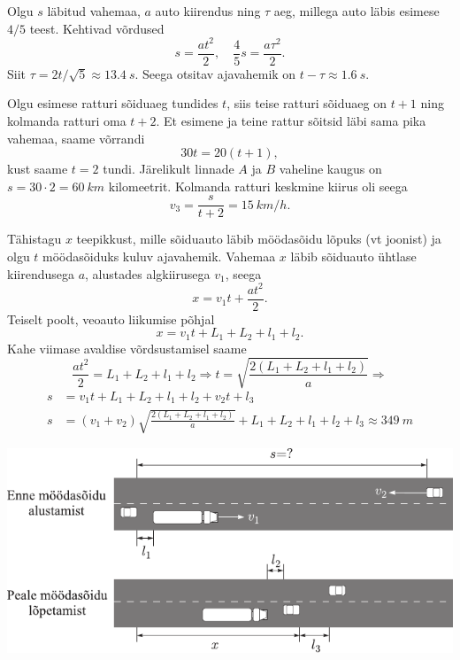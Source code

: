 \documentclass[10pt, twoside]{article}
\begin{document}
{%

\solu
Olgu $s$ läbitud vahemaa, $a$ auto kiirendus ning $\tau$ aeg, millega auto läbis esimese $4/5$ teest. Kehtivad võrdused
\[
s=\frac{a t^{2}}{2}, \quad \frac{4}{5} s=\frac{a \tau^{2}}{2}.
\]
Siit $\tau = 2t/\sqrt 5\approx \SI{13,4}{s}$. Seega otsitav ajavahemik on $t-\tau\approx \SI{1,6}{s}$.
\probend
\bigskip


\solu
Olgu esimese ratturi sõiduaeg tundides $t$, siis teise ratturi sõiduaeg on $t + 1$ ning kolmanda ratturi oma $t+2$. Et esimene ja teine rattur sõitsid läbi sama pika vahemaa, saame võrrandi
\[
30 t=20(t+1),
\]
kust saame $t = \num{2}$ tundi. Järelikult linnade $A$ ja $B$ vaheline kaugus on $s = \num{30}·\num{2} = \SI{60}{km}$ kilomeetrit. Kolmanda ratturi keskmine kiirus oli seega
\[
v_{3}=\frac{s}{t+2}=\SI{15}{km/h}.
\]
\probend
\bigskip


\solu
Tähistagu $x$ teepikkust, mille sõiduauto läbib möödasõidu lõpuks (vt joonist) ja olgu $t$ möödasõiduks kuluv ajavahemik. Vahemaa $x$ läbib sõiduauto ühtlase kiirendusega $a$, alustades algkiirusega $v_1$, seega
\[
x = v_1t + \frac{at^2}{2}. 
\]
Teiselt poolt, veoauto liikumise põhjal
\[
x = v_1t + L_1 + L_2 + l_1 + l_2.
\]
Kahe viimase avaldise võrdsustamisel saame
\[
\frac{a t^{2}}{2}=L_{1}+L_{2}+l_{1}+l_{2} \Rightarrow t=\sqrt{\frac{2\left(L_{1}+L_{2}+l_{1}+l_{2}\right)}{a}}\Rightarrow
\]
\[
\begin{aligned}
s &= v_1t + L_1 + L_2 + l_1 + l_2 + v_2t + l_3\\
s &= \left(v_{1}+v_{2}\right) \sqrt{\frac{2\left(L_{1}+L_{2}+l_{1}+l_{2}\right)}{a}}+L_{1}+L_{2}+l_{1}+l_{2}+l_{3} \approx \SI{349}{m}
\end{aligned}
\]

\begin{center}
	\includegraphics[width=\linewidth]{2005-v2g-01-lah}
\end{center}

}
\end{document}

